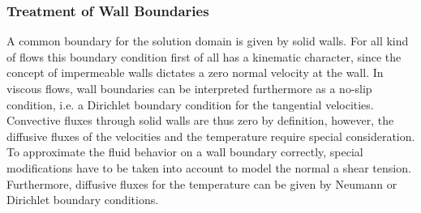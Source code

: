\subsubsection{Treatment of Wall Boundaries}
\label{sec:walls}
    
A common boundary for the solution domain is given by solid walls. For all kind of flows this boundary condition first of all has a kinematic character, since the concept of impermeable walls dictates a zero normal velocity at the wall. In viscous flows, wall boundaries can be interpreted furthermore as a no-slip condition, i.e. a Dirichlet boundary condition for the tangential velocities. Convective fluxes through solid walls are thus zero by definition, however, the diffusive fluxes of the velocities and the temperature require special consideration. To approximate the fluid behavior on a wall boundary correctly, special modifications have to be taken into account to model the normal a shear tension. Furthermore, diffusive fluxes for the temperature can be given by Neumann or Dirichlet boundary conditions.

